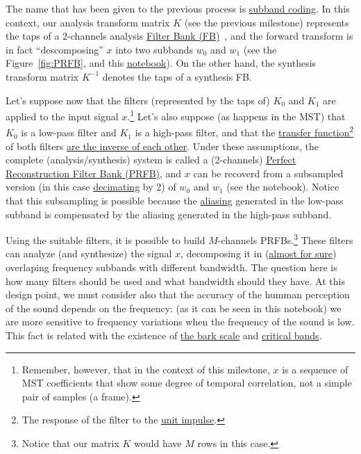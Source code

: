 The name that has been given to the previous process is
\href{https://en.wikipedia.org/wiki/Sub-band_coding}{subband
  coding}. In this context, our analysis transform matrix $K$ (see the
previous milestone) represents the taps of a 2-channels analysis
\href{https://en.wikipedia.org/wiki/Filter_bank}{Filter Bank
  (FB)}~\cite{vetterli1995wavelets}, and the forward transform is in
fact ``descomposing'' $x$ into two subbands $w_0$ and $w_1$ (see the
Figure~\ref{fig:PRFB}, and this \href{}{notebook}). On the other hand,
the synthesis transform matrix $K^{-1}$ denotes the taps of a
synthesis FB.

Let's suppose now that the filters (represented by the taps of) $K_0$
and $K_1$ are applied to the input signal $x$.\footnote{Remember,
  however, that in the context of this milestone, $x$ is a sequence of
  MST coefficients that show some degree of temporal correlation, not
  a simple pair of samples (a frame).} Let's also suppose (as happens
in the MST) that $K_0$ is a low-pass filter and $K_1$ is a high-pass
filter, and that the
\href{https://en.wikipedia.org/wiki/Filter_(signal_processing)#The_transfer_function}{transfer
  function}\footnote{The response of the filter to the
  \href{https://en.wikipedia.org/?title=Unit_impulse&redirect=no}{unit
    impulse}.} of both filters
\href{https://en.wikipedia.org/wiki/Filter_bank#Perfect_reconstruction_filter_banks}{are
  the inverse of each other}. Under these assumptions, the complete
(analysis/synthesis) system is called a (2-channels)
\href{https://en.wikipedia.org/wiki/Filter_bank#Perfect_reconstruction_filter_banks}{Perfect
  Reconstruction Filter Bank (PRFB)}, and $x$ can be recoverd from a
subsampled version (in this case
\href{https://en.wikipedia.org/wiki/Downsampling_(signal_processing)}{decimating}
by 2) of $w_0$ and $w_1$ (see the notebook). Notice that this
subsampling is possible because the
\href{https://en.wikipedia.org/wiki/Aliasing}{aliasing} generated in
the low-pass subband is compensated by the aliasing generated in the
high-pass subband.

Using the suitable filters, it is possible to build $M$-channels
PRFBs.\footnote{Notice that our matrix $K$ would have $M$ rows in this
  case.} These filters can analyze (and synthesize) the signal $x$,
decomposing it in
(\href{https://en.wikipedia.org/wiki/Low-pass_filter#Ideal_and_real_filters}{almost
  for sure}) overlaping frequency subbands with different
bandwidth. The question here is how many filters should be used and
what bandwidth should they have. At this design point, we must
consider also that the accuracy of the humman perception of the sound
depends on the frequency: (as it can be seen in this notebook) we are
more sensitive to frequency variations when the frequency of the sound
is low. This fact is related with the existence of
\href{https://en.wikipedia.org/wiki/Bark_scale}{the bark scale} and
\href{https://en.wikipedia.org/wiki/Critical_band}{critical bands}.

